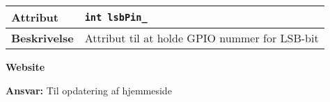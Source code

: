 \begin{center}
    \begin{tabular}{ | l | p{} |}
    \hline
    \textbf{Attribut}		& \verb+int lsbPin_ +		 								\\ \hline
    \textbf{Beskrivelse} 	& Attribut til at holde GPIO nummer for LSB-bit				\\ \hline
    \end{tabular}
\end{center}




{\centering
\textbf{Website}\par
}
\textbf{Ansvar:} Til opdatering af hjemmeside \